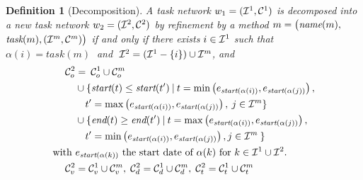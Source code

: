 \documentclass[letterpaper]{article} %
\newtheorem{definition}{Definition}
\newcommand{\name}{\text{\it name}}
\newcommand{\tstart}{\text{\it start}}
\newcommand{\tend}{\text{\it end}}
\newcommand{\task}{\text{\it task}}
\begin{document}
\begin{definition}[Decomposition]\label{def:decomp}
  A task network $w_1= ({\cal{I}}^1, {\cal{C}}^{1})$ is decomposed into a new task network
  $w_2= ({\cal{I}}^2, {\cal{C}}^{2})$ by refinement by a method $m = \bigl(\name(m),$ $\task(m), ({\cal{I}}^m, {\cal{C}}^{m})\bigr)$
  if and only if there exists \mbox{$i \in {\cal{I}}^1$} such that $\alpha(i) = task(m)\;$ and
  $\;{\cal{I}}^2 = ({\cal{I}}^1 - \{i\}) \cup {\cal{I}}^m$, and
\begin{equation*} \label{eq1}
\begin{aligned}
{\cal{C}}^{2}_{o} &= \:{\cal{C}}^{1}_{o} \cup {\cal{C}}^{m}_{o} \\
& \cup \{ \tstart(t) \leq \tstart(t') \: | \: t= \min\left(e_{\tstart(\alpha(i))},e_{\tstart(\alpha(j))}\right),\\
&\quad t'= \max\left(e_{\tstart(\alpha(i))},e_{\tstart(\alpha(j))}\right), \: j \in {\cal{I}}^m \}  \\
& \cup \{ \tend(t) \geq \tend(t') \: | \: t=\max\left(e_{\tstart(\alpha(i))},e_{\tstart(\alpha(j))}\right),\\
& \quad t'= \min\left(e_{\tstart(\alpha(i))},e_{\tstart(\alpha(j))}\right), j \in {\cal{I}}^m \:  \}\\
\text{with } &e_{\tstart(\alpha(k))} \text{ the start date of } \alpha(k) \text{ for } k \in {\cal{I}}^1 \cup  {\cal{I}}^2.\\
{\cal{C}}^{2}_{v}  &=  {\cal{C}}^{1}_{v} \cup {\cal{C}}^{m}_{v},\;
{\cal{C}}^{2}_{d}  =  {\cal{C}}^{1}_{d} \cup {\cal{C}}^{m}_{d},\;
{\cal{C}}^{2}_{t}  =  {\cal{C}}^{1}_{t} \cup {\cal{C}}^{m}_{t}
\end{aligned}
\end{equation*}
\end{definition}
\end{document}
